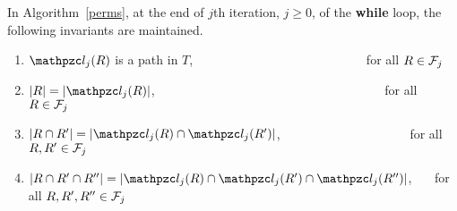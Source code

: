 \begin{lemma}
  \label{lem:invar1} In Algorithm~\ref{perms}, at the end of $j$th
  iteration, $j \ge 0$, of the {\bf while} loop, the following
  invariants are maintained.
  \begin{enumerate}[I {\ }] %
  \item $\cl_j(R)$ is a path in $T$, \ \ \ \ \ \ \ \ \ \ \ \ \ \ \ \ \
    \ \ \ \ \ \ \ \ \ \ for all $R \in {\cal F}_j$%
  \item $|R| = |\cl_j(R)|$, \ \ \ \ \ \ \ \ \ \ \ \ \ \ \ \ \ \ \ \ \
    \ \ \ \ \ \ \ \ \ \ \ \ \ \ \ for all $R \in
    {\cal F}_j$%
  \item $|R \cap R'| = |\cl_j(R) \cap \cl_j(R')|$, \ \ \ \ \ \ \ \ \ \
    \ \ \ \ \ \ \ \ \ \ for all $R, R' \in {\cal F}_j$%
  \item $|R \cap R' \cap R''|=|\cl_j(R) \cap \cl_j(R') \cap
    \cl_j(R'')|$, \ \ \ for all $R, R', R'' \in {\cal F}_j$
  \end{enumerate}
\end{lemma}

